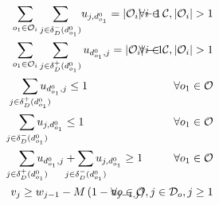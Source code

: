 \documentclass{article}
\begin{document}
\begin{alignat}{3}
    \label{mod:c11}        & \sum_{ \substack{o_1 \in \mathcal{O}_i }}{ \sum_{ j \in \delta^{-}_{D}(d^0_{o_1})}}{u_{j,d^0_{o_1} } } = |\mathcal{O}_i|-1                                                                                                                                                             & \hspace{-20mm} \forall  i \in \mathcal{C},|\mathcal{O}_i| > 1                                    \\
    \label{mod:c12}        & \sum_{ \substack{o_1 \in \mathcal{O}_i }}\sum_{ j \in \delta^{+}_{D}(d^0_{o_1})}{u_{d^0_{o_1},j } } = |\mathcal{O}_i|-1                                                                                                                                                                & \hspace{-40mm} \forall  i \in \mathcal{C}, |\mathcal{O}_i| > 1                                   \\
    \label{mod:c13}        & \hspace{3mm} \smashoperator{ \sum_{ j \in \delta^{+}_{D}(d^0_{o_1})}}{u_{d^0_{o_1},j } } \leq 1                                                                                                                                                                                        & \hspace{-20mm}  \forall o_1 \in \mathcal{O}                                                      \\
    \label{mod:c14}        & \hspace{2mm} \smashoperator{ \sum_{ j \in \delta^{-}_{D}(d^0_{o_1})}}{u_{j,d^0_{o_1} } } \leq 1                                                                                                                                                                                        & \hspace{-20mm} \forall o_1 \in \mathcal{O}                                                       \\
    \label{mod:c15}        & \hspace{2mm} \smashoperator{ \sum_{ j \in \delta^{+}_{D}(d^0_{o_1})}}{u_{d^0_{o_1},j } } +\smashoperator{ \sum_{ j \in \delta^{-}_{D}(d^0_{o_1})}}{u_{j,d^0_{o_1} } } \geq 1                                                                                                           & \hspace{-20mm} \forall o_1 \in \mathcal{O}                                                       \\
    \label{mod:c16}        & v_{j} \geq w_{j-1} - M\left(1- u_{j-1,j}\right)                                                                                                                                                                                                                                        & \hspace{-20mm}  \forall o \in \mathcal{O}, j \in \mathcal{D}_{o}, j \geq 1                       \\

\end{alignat}
\end{document}
